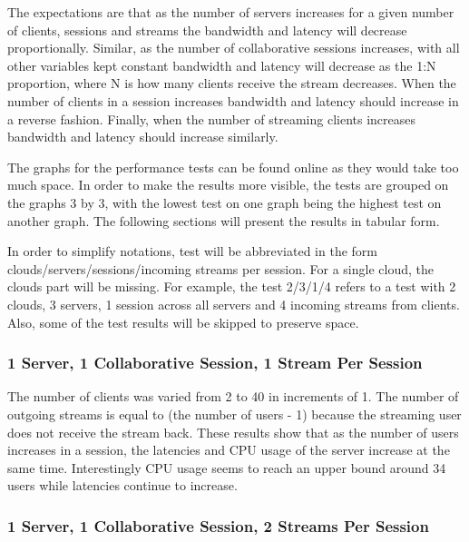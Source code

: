 The expectations are that as the number of servers increases for a given number of clients, sessions and streams the bandwidth and latency will decrease proportionally. Similar, as the number of collaborative sessions increases, with all other variables kept constant bandwidth and latency will decrease as the 1:N proportion, where N is how many clients receive the stream decreases. When the number of clients in a session increases bandwidth and latency should increase in a reverse fashion. Finally, when the number of streaming clients increases bandwidth and latency should increase similarly.

The graphs for the performance tests can be found online as they would take too much space. In order to make the results more visible, the tests are grouped on the graphs 3 by 3, with the lowest test on one graph being the highest test on another graph. The following sections will present the results in tabular form.

In order to simplify notations, test will be abbreviated in the form clouds/servers/sessions/incoming streams per session. For a single cloud, the clouds part will be missing. For example, the test 2/3/1/4 refers to a test with 2 clouds, 3 servers, 1 session across all servers and 4 incoming streams from clients. Also, some of the test results will be skipped to preserve space.

\subsubsection{1 Server, 1 Collaborative Session, 1 Stream Per Session}
\label{sec:1serv_1sess_1str}

The number of clients was varied from 2 to 40 in increments of 1. The number of outgoing streams is equal to (the number of users - 1) because the streaming user does not receive the stream back. These results show that as the number of users increases in a session, the latencies and CPU usage of the server increase at the same time. Interestingly CPU usage seems to reach an upper bound around 34 users while latencies continue to increase.

\subsubsection{1 Server, 1 Collaborative Session, 2 Streams Per Session}
\label{sec:1serv_1sess_2str180}

